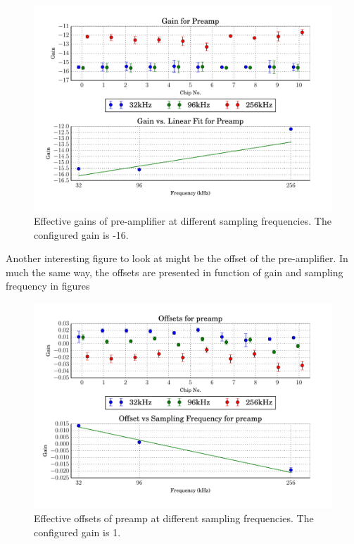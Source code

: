 \begin{figure}
    \centering
    \includegraphics[width=\linewidth]{images/plots/dc_slope_preamp_gain-16.pdf}
    \caption{Effective gains of pre-amplifier at different sampling frequencies. The configured gain is -16.}
    \label{fig:preamp_slope-16}
\end{figure}

Another   interesting  figure  to  look  at  might  be  the  offset   of   the
pre-amplifier. In much the same way,  the offsets are presented in function of
gain and sampling frequency in figures

\begin{figure}
    \centering
    \includegraphics[width=\linewidth]{images/plots/dc_offsets_preamp.pdf}
    \caption{Effective offsets of preamp at different sampling frequencies. The configured gain is 1.}
    \label{fig:preamp_offsets}
\end{figure}


